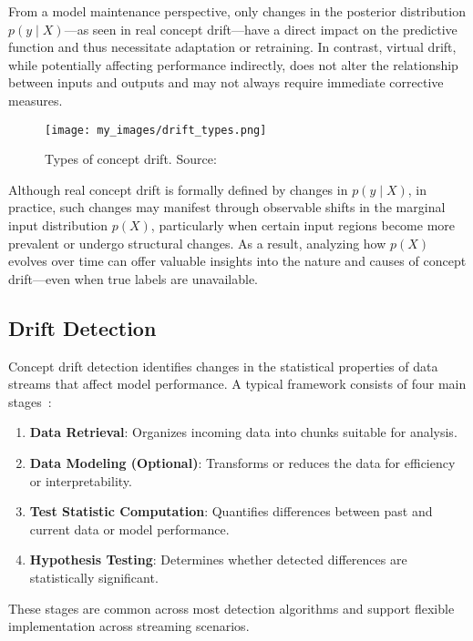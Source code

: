 From a model maintenance perspective, only changes in the posterior distribution $p(y \mid X)$—as
seen in real concept drift—have a direct impact on the predictive function and thus
necessitate adaptation or retraining. In contrast, virtual drift, while potentially
affecting performance indirectly, does not alter the relationship between inputs and
outputs and may not always require immediate corrective measures.

\begin{figure}[h]
    \centering
    \texttt{[image: my\_images/drift\_types.png]}
    \caption{Types of concept drift. Source:~\cite{drift_adaptation_survey}}\label{fig:concept_drift_types}
\end{figure}

Although real concept drift is formally defined by changes in $p(y \mid X)$, in
practice, such changes may manifest through observable shifts in the marginal
input distribution $p(X)$, particularly when certain input regions become more
prevalent or undergo structural changes. As a result, analyzing how $p(X)$
evolves over time can offer valuable insights into the nature and causes of
concept drift—even when true labels are unavailable.

\subsection*{Drift Detection}\label{subsec:drift_detection}
Concept drift detection identifies changes in the statistical properties of
data streams that affect model performance. A typical framework consists of
four main stages~\cite{learning_under_concept_drift}:

\begin{enumerate}
    \item \textbf{Data Retrieval}: Organizes incoming data into chunks
          suitable for analysis.
    \item \textbf{Data Modeling (Optional)}: Transforms or reduces the data
          for efficiency or interpretability.
    \item \textbf{Test Statistic Computation}: Quantifies differences between
          past and current data or model performance.
    \item \textbf{Hypothesis Testing}: Determines whether detected differences
          are statistically significant.
\end{enumerate}

These stages are common across most detection algorithms and support flexible
implementation across streaming scenarios.

